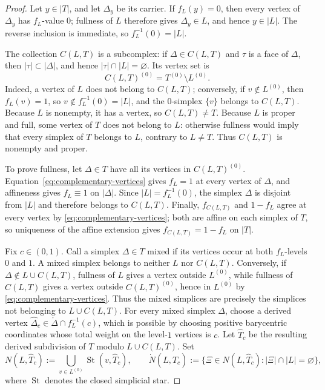 \documentclass[12pt,oneside,a4paper]{article}
\theoremstyle{mytheorem}
\theoremstyle{remark}
\theoremstyle{definition}
\begin{document}
\begin{proof}
Let $y\in|T|$, and let $\Delta_y$ be its carrier.  If $f_L(y)=0$, then
every vertex of $\Delta_y$ has $f_L$-value $0$; fullness of $L$ therefore
gives $\Delta_y\in L$, and hence $y\in|L|$.  The reverse inclusion is
immediate, so $f_L^{-1}(0)=|L|$.

The collection $C(L,T)$ is a subcomplex: if $\Delta\in C(L,T)$ and
$\tau$ is a face of $\Delta$, then $|\tau|\subset|\Delta|$, and hence
$|\tau|\cap|L|=\varnothing$.  Its vertex set is
\begin{equation}\label{eq:complementary-vertices}
 C(L,T)^{(0)}=T^{(0)}\setminus L^{(0)}.
\end{equation}
Indeed, a vertex of $L$ does not belong to $C(L,T)$; conversely, if
$v\notin L^{(0)}$, then $f_L(v)=1$, so
$v\notin f_L^{-1}(0)=|L|$, and the $0$-simplex $\{v\}$ belongs to
$C(L,T)$.  Because $L$ is nonempty, it has a vertex, so
$C(L,T)\neq T$.  Because $L$ is proper and full, some vertex of $T$
does not belong to $L$: otherwise fullness would imply that every
simplex of $T$ belongs to $L$, contrary to $L\neq T$.  Thus $C(L,T)$
is nonempty and proper.

To prove fullness, let $\Delta\in T$ have all its vertices in
$C(L,T)^{(0)}$.  Equation~\eqref{eq:complementary-vertices} gives
$f_L=1$ at every vertex of $\Delta$, and affineness gives
$f_L\equiv1$ on $|\Delta|$.  Since $|L|=f_L^{-1}(0)$, the simplex
$\Delta$ is disjoint from $|L|$ and therefore belongs to $C(L,T)$.
Finally, $f_{C(L,T)}$ and $1-f_L$ agree at every vertex by
\eqref{eq:complementary-vertices}; both are affine on each simplex of
$T$, so uniqueness of the affine extension gives
$f_{C(L,T)}=1-f_L$ on $|T|$.

Fix $c\in(0,1)$.  Call a simplex $\Delta\in T$ mixed if
its vertices occur at both $f_L$-levels $0$ and $1$.  A mixed simplex
belongs to neither $L$ nor $C(L,T)$.  Conversely, if
$\Delta\notin L\cup C(L,T)$, fullness of $L$ gives a vertex outside
$L^{(0)}$, while fullness of $C(L,T)$ gives a vertex outside
$C(L,T)^{(0)}$, hence in $L^{(0)}$ by
\eqref{eq:complementary-vertices}.  Thus the
mixed simplices are precisely the simplices not belonging to
$L\cup C(L,T)$.  For every mixed simplex $\Delta$, choose a derived vertex
$\widehat\Delta_c\in\mathring\Delta\cap f_L^{-1}(c)$, which
is possible by choosing positive barycentric coordinates whose
total weight on the level-$1$ vertices is $c$.  Let $\widehat T_c$ be
the resulting derived subdivision
of $T$ modulo $L\cup C(L,T)$.  Set
\[
N(L,\widehat T_c)
:=\bigcup_{v\in L^{(0)}}\operatorname{St}(v,\widehat T_c),
\qquad
\dot N(L,\widehat T_c)
:=\bigl\{\Xi\in N(L,\widehat T_c):
|\Xi|\cap|L|=\varnothing\bigr\},
\]
where $\operatorname{St}$ denotes the closed simplicial star.


\end{proof}
\end{document}
